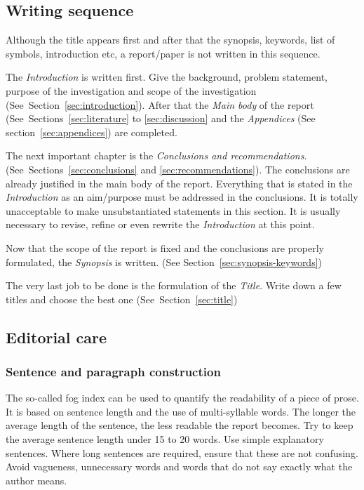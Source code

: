 \documentclass[a5paper, 10pt]{article}
\newcommand{\subsectionname}[1]{\emph{#1}}
\begin{document}
\subsection{Writing sequence}
Although the title appears first and after that the synopsis,
keywords, list of symbols, introduction etc, a report/paper is not
written in this sequence.

The \subsectionname{Introduction} is written first.  Give the background,
problem statement, purpose of the investigation and scope of the
investigation (See~Section~\ref{sec:introduction}).  After that the
\subsectionname{Main body} of the report (See~Sections~\ref{sec:literature} to
\ref{sec:discussion} and the \subsectionname{Appendices} (See
section~\ref{sec:appendices}) are completed.

The next important chapter is the \subsectionname{Conclusions and
  recommendations}.  (See~Sections~\ref{sec:conclusions} and
\ref{sec:recommendations}).  The conclusions are already justified in
the main body of the report.  Everything that is stated in the
\subsectionname{Introduction} as an aim/purpose must be addressed in the
conclusions.  It is totally unacceptable to make unsubstantiated
statements in this section.  It is usually necessary to revise, refine
or even rewrite the \subsectionname{Introduction} at this point.

Now that the scope of the report is fixed and the conclusions are
properly formulated, the \subsectionname{Synopsis} is written.  (See
Section~\ref{sec:synopsis-keywords})

The very last job to be done is the formulation of
the \subsectionname{Title}.  Write down a few titles and choose the best
one (See~Section~\ref{sec:title})

\subsection{Editorial care}

\subsubsection{Sentence and paragraph construction}
The so-called fog index can be used to quantify the readability of a
piece of prose.  It is based on sentence length and the use of
multi-syllable words.  The longer the average length of the sentence,
the less readable the report becomes.  Try to keep the average
sentence length under 15 to 20 words.  Use simple explanatory
sentences.  Where long sentences are required, ensure that these are
not confusing.  Avoid vagueness, unnecessary words and words that do
not say exactly what the author means.
\end{document}
